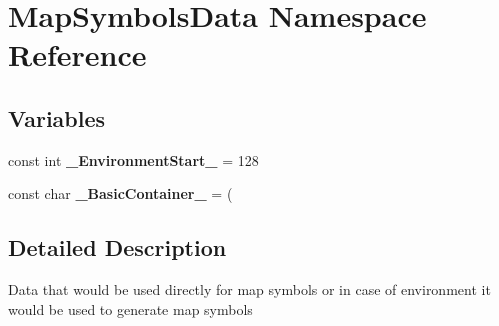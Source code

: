 \hypertarget{namespace_map_symbols_data}{}\section{Map\+Symbols\+Data Namespace Reference}
\label{namespace_map_symbols_data}
\subsection*{Variables}
\begin{DoxyCompactItemize}
\item 
\hypertarget{namespace_map_symbols_data_a05f9ea588b6fba356454972c587c7620}{}\label{namespace_map_symbols_data_a05f9ea588b6fba356454972c587c7620} 
const int {\bfseries \+\_\+\+Environment\+Start\+\_\+} = 128
\item 
\hypertarget{namespace_map_symbols_data_a3019a34c15fe9301da37d5971a2d6e9f}{}\label{namespace_map_symbols_data_a3019a34c15fe9301da37d5971a2d6e9f} 
const char {\bfseries \+\_\+\+Basic\+Container\+\_\+} = \textquotesingle{}(\textquotesingle{}
\end{DoxyCompactItemize}


\subsection{Detailed Description}
Data that would be used directly for map symbols or in case of environment it would be used to generate map symbols 